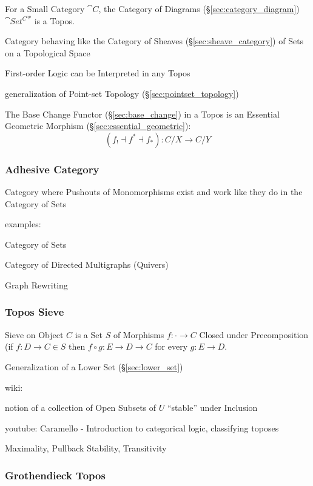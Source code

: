 For a Small Category $\cat{C}$, the Category of Diagrams
(\S\ref{sec:category_diagram}) $\cat{Set^{C^{op}}}$ is a
Topos.\cite{awodey06}

Category behaving like the Category of Sheaves
(\S\ref{sec:sheave_category}) of Sets on a Topological Space

First-order Logic can be Interpreted in any Topos

generalization of Point-set Topology (\S\ref{sec:pointset_topology})

The Base Change Functor (\S\ref{sec:base_change}) in a Topos is an
Essential Geometric Morphism (\S\ref{sec:essential_geometric}):
\[
  (f_! \dashv f^* \dashv f_*):C/X \rightarrow C/Y
\]



\subsubsection{Adhesive Category}\label{sec:adhesive_category}

Category where Pushouts of Monomorphisms exist and work like they do in the
Category of Sets

examples:

Category of Sets

Category of Directed Multigraphs (Quivers)

Graph Rewriting %



\subsubsection{Topos Sieve}\label{sec:topos_sieve}

Sieve on Object $C$ is a Set $S$ of Morphisms $f : \cdot \rightarrow
C$ Closed under Precomposition (if $f : D \rightarrow C \in S$ then $f
\circ g : E \rightarrow D \rightarrow C$ for every $g : E \rightarrow
D$.

Generalization of a Lower Set (\S\ref{sec:lower_set})

wiki:

notion of a collection of Open Subsets of $U$ ``stable'' under
Inclusion %

youtube: Caramello - Introduction to categorical logic, classifying
toposes

Maximality, Pullback Stability, Transitivity %



\subsubsection{Grothendieck Topos}\label{sec:grothendieck_topos}

